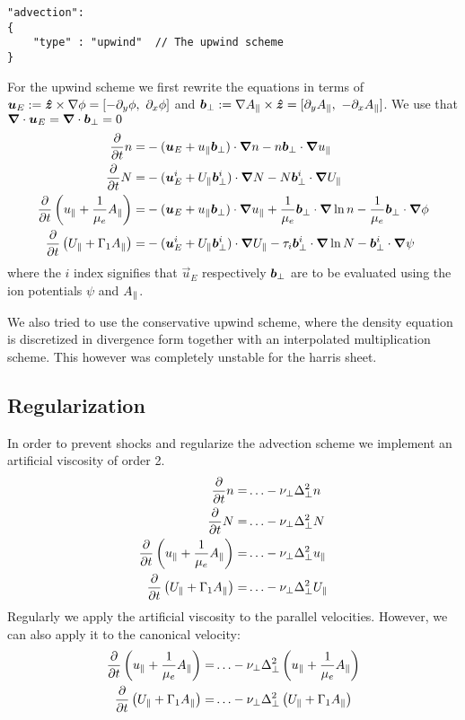 \begin{verbatim}
"advection":
{
    "type" : "upwind"  // The upwind scheme
}
\end{verbatim}
For the upwind scheme we first rewrite the equations in terms of
${\boldsymbol{u}}_E := \bm{\hat{z}} \times \nabla\phi = [-\partial_y \phi,\ \partial_x \phi]$ and
$ {\boldsymbol{b}}_\perp := \nabla A_\parallel \times \bm{\hat{z}} = [\partial_y A_\parallel,\ -\partial_x A_\parallel]$. We use
that ${\boldsymbol{\nabla}}\cdot {\boldsymbol{u}}_E = {\boldsymbol{\nabla}}\cdot  {\boldsymbol{b}}_\perp =0$
\begin{align}
\frac{\partial}{\partial t} n  =&
- ( {\boldsymbol{u}}_E + u_\parallel  {\boldsymbol{b}}_\perp)\cdot{\boldsymbol{\nabla}} n  - n   {\boldsymbol{b}}_\perp \cdot{\boldsymbol{\nabla}}  u_\parallel
\\
\frac{\partial}{\partial t} N =&
- ( {\boldsymbol{u}}_E^i + U_\parallel  {\boldsymbol{b}}_\perp^i)\cdot{\boldsymbol{\nabla}} N - N  {\boldsymbol{b}}_\perp^i\cdot{\boldsymbol{\nabla}}  U_\parallel
 \\
\frac{\partial}{\partial t} \left( u_\parallel+ \frac{1}{\mu_e} A_\parallel \right) =&
-  ({\boldsymbol{u}}_E + u_\parallel  {\boldsymbol{b}}_\perp ) \cdot{\boldsymbol{\nabla}} u_\parallel
+ \frac{1}{\mu_e}  {\boldsymbol{b}}_\perp \cdot{\boldsymbol{\nabla}} \ln n 
- \frac{1}{\mu_e}  {\boldsymbol{b}}_\perp \cdot{\boldsymbol{\nabla}} \phi
      \\
      \frac{\partial}{\partial t} \left( U_\parallel+ \Gamma_1 A_\parallel  \right) =&
    - ({\boldsymbol{u}}_E^i + U_\parallel  {\boldsymbol{b}}_\perp^i ) \cdot{\boldsymbol{\nabla}} U_\parallel
    - \tau_i  {\boldsymbol{b}}_\perp^i \cdot{\boldsymbol{\nabla}} \ln N
    -  {\boldsymbol{b}}_\perp^i \cdot{\boldsymbol{\nabla}} \psi
\end{align}
where the $i$ index signifies that $\vec u_E$ respectively $ {\boldsymbol{b}}_\perp$ are to
be evaluated using the ion potentials $\psi$ and $A_\parallel$.
\begin{tcolorbox}[title=Note]
    We also tried to use the conservative upwind scheme, where the density equation
    is discretized in divergence form together with an interpolated multiplication
    scheme. This however was completely unstable for the harris sheet.
\end{tcolorbox}
\subsection{Regularization} \label{sec:regularization}
In order to prevent shocks and regularize the advection scheme
we implement an artificial viscosity of order 2.
\begin{align}
    \frac{\partial}{\partial t} n  =& \ldots -\nu_\perp \Delta_\perp^2 n 
\\
\frac{\partial}{\partial t} N =& \ldots -\nu_\perp \Delta_\perp^2 N
 \\
\frac{\partial}{\partial t} \left( u_\parallel+ \frac{1}{\mu_e} A_\parallel \right) =&
\ldots -\nu_\perp \Delta_\perp^2 u_\parallel
      \\
      \frac{\partial}{\partial t} \left( U_\parallel+ \Gamma_1 A_\parallel  \right) =& \ldots -\nu_\perp \Delta_\perp^2 U_\parallel
\end{align}
Regularly we apply the artificial viscosity to the parallel velocities. However,
we can also apply it to the canonical velocity:
\begin{align}
\frac{\partial}{\partial t} \left( u_\parallel+ \frac{1}{\mu_e} A_\parallel \right) =&
\ldots -\nu_\perp \Delta_\perp^2 \left( u_\parallel+ \frac{1}{\mu_e} A_\parallel \right)
      \\
      \frac{\partial}{\partial t} \left( U_\parallel+ \Gamma_1 A_\parallel  \right) =& \ldots -\nu_\perp \Delta_\perp^2 \left( U_\parallel+ \Gamma_1 A_\parallel  \right)
\end{align}

